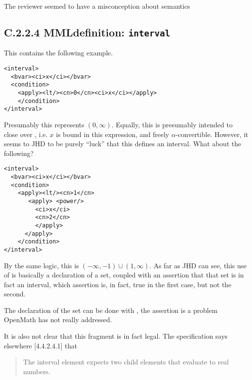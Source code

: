 \documentclass{llncs}
\begin{document}
\begin{newpart}{The reviewer seemed to have a misconception about semantics}
\subsection{C.2.2.4 MMLdefinition: {\tt interval}}\label{C224}
This contains the following example.
\begin{lstlisting}[language=MathML2]
<interval>
  <bvar><ci>x</ci></bvar>
  <condition>
    <apply><lt/><cn>0</cn><ci>x</ci></apply>
    </condition>
</interval>
\end{lstlisting}
Presumably this represents $(0,\infty)$. Equally, this is presumably intended
to close over {}, i.e. $x$ is bound in this expression, and
freely $\alpha$-convertible. However, it seems to JHD to be purely ``luck''
that this defines an interval. What about the following?
\begin{lstlisting}[language=MathML2]
<interval>
  <bvar><ci>x</ci></bvar>
  <condition>
    <apply><lt/><cn>1</cn>
       <apply> <power/>
         <ci>x</ci>
         <cn>2</cn>
         </apply>
      </apply>
    </condition>
</interval>
\end{lstlisting}
By the same logic, this is $(-\infty,-1)\cup(1,\infty)$.  As far as JHD can
see, this use of {} is basically a declaration of a set, coupled
with an assertion that that set is in fact an interval, which assertion is, in
fact, true in the first case, but not the second.
\par
The declaration of the set can be done with {}, the assertion is
a problem OpenMath has not really addressed.
\par
It is also not clear that this fragment is in fact legal. The specification
says elsewhere [4.4.2.4.1] that
\begin{quotation}\noindent
The interval element expects two child elements that evaluate to real numbers. 
\end{quotation} 

\end{newpart}
\end{document}
